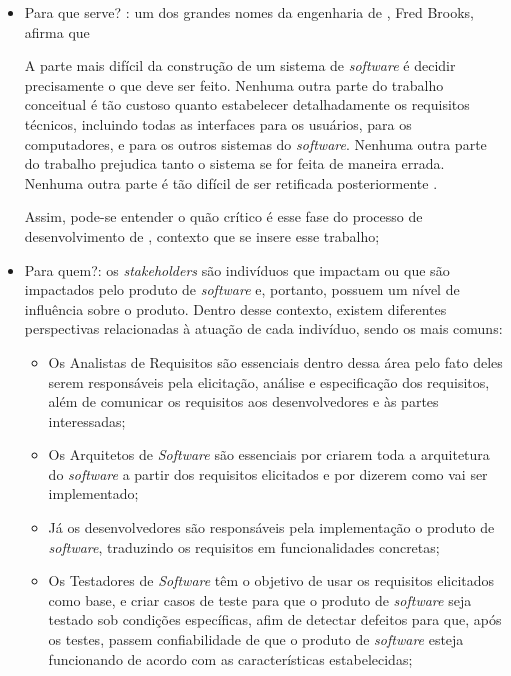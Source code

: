 \begin{itemize}
    \item Para que serve? : um dos grandes nomes da engenharia de , Fred Brooks, afirma que
        \begin{citacao}
            A parte mais difícil da construção de um sistema de \textit{software} é decidir precisamente o que deve ser feito. Nenhuma outra parte do trabalho conceitual é tão  custoso quanto estabelecer detalhadamente os requisitos técnicos, incluindo todas as interfaces para os usuários, para os computadores, e para os outros sistemas do \textit{software}. Nenhuma outra parte do trabalho prejudica tanto o sistema se for feita de maneira errada. Nenhuma outra parte é tão difícil de ser retificada posteriormente \cite[p.~199]{brooks1995mythical}.
        \end{citacao}
    Assim, pode-se entender o quão crítico é esse fase do processo de desenvolvimento de , contexto que se insere esse trabalho;
    
    \item Para quem?: os \textit{stakeholders} são indivíduos que impactam ou que são impactados pelo produto de \textit{software} e, portanto, possuem um nível de influência sobre o produto. Dentro desse contexto, existem diferentes perspectivas relacionadas à atuação de cada indivíduo, sendo os mais comuns:
    
    \begin{itemize}
        \item Os Analistas de Requisitos são essenciais dentro dessa área pelo fato deles serem responsáveis pela elicitação, análise e especificação dos requisitos, além de comunicar os requisitos aos desenvolvedores e às partes interessadas;
    
        \item Os Arquitetos de \textit{Software} são essenciais por criarem toda a arquitetura do \textit{software} a partir dos requisitos elicitados e por dizerem como vai ser implementado;
    
        \item Já os desenvolvedores são responsáveis pela implementação o produto de \textit{software}, traduzindo os requisitos em funcionalidades concretas;
    
        \item Os Testadores de \textit{Software} têm o objetivo de usar os requisitos elicitados como base, e criar casos de teste para que o produto de \textit{software} seja testado sob condições específicas, afim de detectar defeitos para que, após os testes, passem confiabilidade de que o produto de \textit{software} esteja funcionando de acordo com as características estabelecidas;
    

\end{itemize}
\end{itemize}
